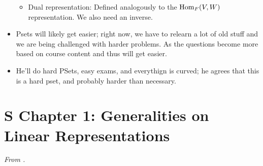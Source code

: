 \documentclass[../notes.tex]{subfiles}
\begin{document}
\begin{itemize}
\begin{itemize}
        \item Dual representation: Defined analogously to the $\operatorname{Hom}_F(V,W)$ representation. We also need an inverse.
    \end{itemize}
    \item Psets will likely get easier; right now, we have to relearn a lot of old stuff and we are being challenged with harder problems. As the questions become more based on course content and thus will get easier.
    \item He'll do hard PSets, easy exams, and everythign is curved; he agrees that this is a hard pset, and probably harder than necessary.
\end{itemize}



\section{S Chapter 1: Generalities on Linear Representations}
\emph{From \textcite{bib:Serre}.}
\end{document}
